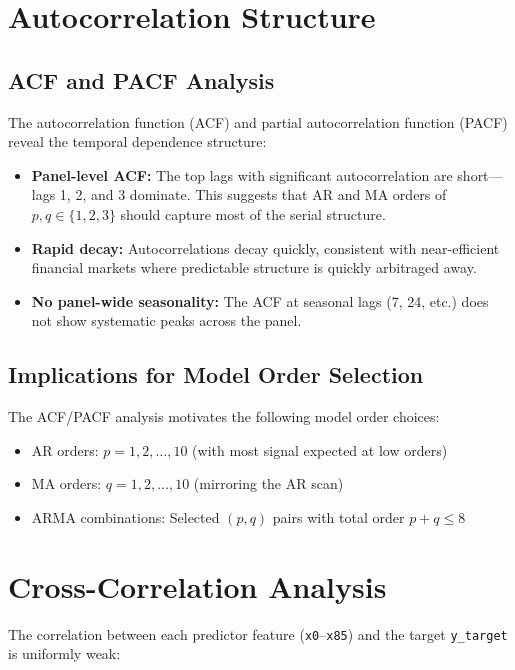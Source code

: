 \section{Autocorrelation Structure}

\subsection{ACF and PACF Analysis}

The autocorrelation function (ACF) and partial autocorrelation function (PACF) reveal the temporal dependence structure:

\begin{itemize}
    \item \textbf{Panel-level ACF:} The top lags with significant autocorrelation are short---lags 1, 2, and 3 dominate. This suggests that AR and MA orders of $p, q \in \{1, 2, 3\}$ should capture most of the serial structure.
    \item \textbf{Rapid decay:} Autocorrelations decay quickly, consistent with near-efficient financial markets where predictable structure is quickly arbitraged away.
    \item \textbf{No panel-wide seasonality:} The ACF at seasonal lags (7, 24, etc.) does not show systematic peaks across the panel.
\end{itemize}

\subsection{Implications for Model Order Selection}

The ACF/PACF analysis motivates the following model order choices:
\begin{itemize}
    \item AR orders: $p = 1, 2, \ldots, 10$ (with most signal expected at low orders)
    \item MA orders: $q = 1, 2, \ldots, 10$ (mirroring the AR scan)
    \item ARMA combinations: Selected $(p, q)$ pairs with total order $p + q \leq 8$
\end{itemize}

\section{Cross-Correlation Analysis}

The correlation between each predictor feature (\texttt{x0}--\texttt{x85}) and the target \texttt{y\_target} is uniformly weak:

